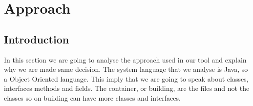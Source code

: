 \documentclass[]{usiinfbachelorproject}
\begin{document}
 




\newpage
\section{Approach} \label{approach}

\subsection{Introduction}
In this section we are going to analyse the approach used in our tool and explain why we are made same decision. The system language that we analyse is Java, so a Object Oriented language. This imply that we are going to speak about classes, interfaces methods and fields. The container, or building, are the files and not the classes so on building can have more classes and interfaces.
\end{document}
